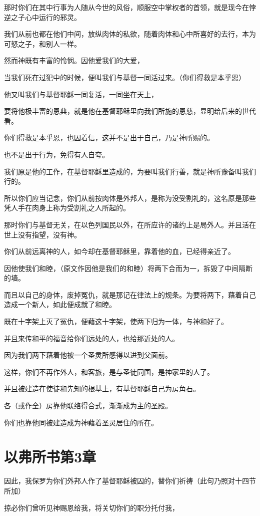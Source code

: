 \documentclass[12pt,oneside]{book}
\begin{document}
那时你们在其中行事为人随从今世的风俗，顺服空中掌权者的首领，就是现今在悖逆之子心中运行的邪灵。

我们从前也都在他们中间，放纵肉体的私欲，随着肉体和心中所喜好的去行，本为可怒之子，和别人一样。

然而神既有丰富的怜悯。因他爱我们的大爱，

当我们死在过犯中的时候，便叫我们与基督一同活过来。（你们得救是本乎恩）

他又叫我们与基督耶稣一同复活，一同坐在天上，

要将他极丰富的恩典，就是他在基督耶稣里向我们所施的恩慈，显明给后来的世代看。

你们得救是本乎恩，也因着信，这并不是出于自己，乃是神所赐的。

也不是出于行为，免得有人自夸。

我们原是他的工作，在基督耶稣里造成的，为要叫我们行善，就是神所豫备叫我们行的。

所以你们应当记念，你们从前按肉体是外邦人，是称为没受割礼的，这名原是那些凭人手在肉身上称为受割礼之人所起的。

那时你们与基督无关，在以色列国民以外，在所应许的诸约上是局外人。并且活在世上没有指望，没有神。

你们从前远离神的人，如今却在基督耶稣里，靠着他的血，已经得亲近了。

因他使我们和睦，（原文作因他是我们的和睦）将两下合而为一，拆毁了中间隔断的墙。

而且以自己的身体，废掉冤仇，就是那记在律法上的规条。为要将两下，藉着自己造成一个新人，如此便成就了和睦。

既在十字架上灭了冤仇，便藉这十字架，使两下归为一体，与神和好了。

并且来传和平的福音给你们远处的人，也给那近处的人。

因为我们两下藉着他被一个圣灵所感得以进到父面前。

这样，你们不再作外人，和客旅，是与圣徒同国，是神家里的人了。

并且被建造在使徒和先知的根基上，有基督耶稣自己为房角石。

各（或作全）房靠他联络得合式，渐渐成为主的圣殿。

你们也靠他同被建造成为神藉着圣灵居住的所在。

\chapter{以弗所书第3章}
因此，我保罗为你们外邦人作了基督耶稣被囚的，替你们祈祷（此句乃照对十四节所加）

掠必你们曾听见神赐恩给我，将关切你们的职分托付我，
\end{document}
